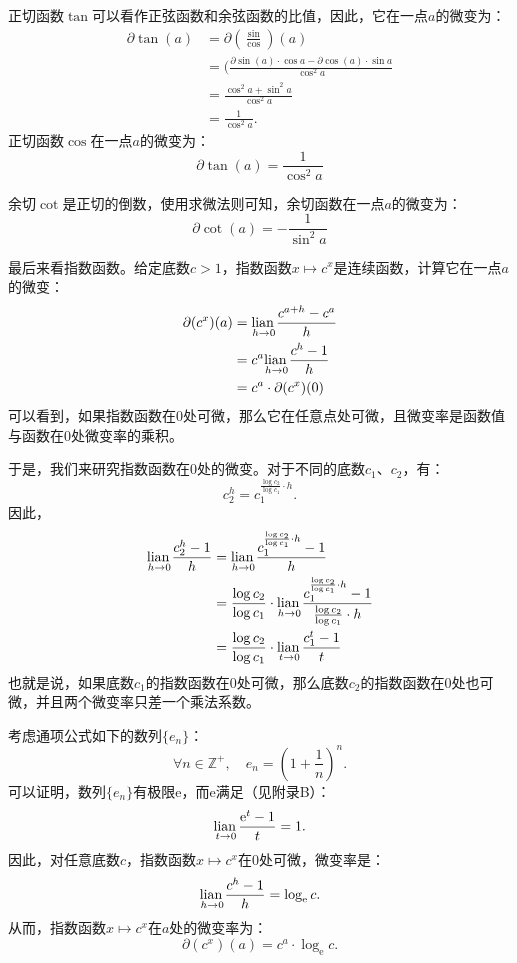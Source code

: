 \documentclass[12pt,UTF8]{ctexbook}
\begin{document}
正切函数$\tan$可以看作正弦函数和余弦函数的比值，因此，它在一点$a$的微变为：
\begin{align*}
    \partial \tan(a) &= \partial \left(\frac{\sin}{\cos}\right)(a)  \\
    &= (\frac{\partial \sin(a) \cdot \cos{a} - \partial \cos(a) \cdot \sin{a}}{\cos^2{a}}  \\
    &= \frac{\cos^2{a} + \sin^2{a}}{\cos^2{a}}  \\
    &= \frac{1}{\cos^2{a}}.  
\end{align*}
正切函数$\cos$在一点$a$的微变为：
$$ \partial \tan(a) = \frac{1}{\cos^2{a}} $$

余切$\cot$是正切的倒数，使用求微法则可知，余切函数在一点$a$的微变为：
$$ \partial \cot(a) = -\frac{1}{\sin^2{a}} $$

最后来看指数函数。给定底数$c > 1$，指数函数$x\mapsto c^x$是连续函数，计算它在一点$a$的微变：
\begin{align*}
    \partial (c^x) (a) &= \underset{h\to 0}{\operatorname{lian}\,} \frac{c^{a+h} - c^a}{h}  \\
    &= c^a \underset{h\to 0}{\operatorname{lian}\,} \frac{c^h - 1}{h}  \\
    &= c^a \cdot \partial (c^x) (0) 
\end{align*}
可以看到，如果指数函数在$0$处可微，那么它在任意点处可微，且微变率是函数值与函数在$0$处微变率的乘积。

于是，我们来研究指数函数在$0$处的微变。对于不同的底数$c_1$、$c_2$，有：
$$c_2^h = c_1^{\frac{\log{c_2}}{\log{c_1}}\cdot h}.$$
因此，
\begin{align*}
    \underset{h\to 0}{\operatorname{lian}\,} \frac{c_2^h - 1}{h} &= \underset{h\to 0}{\operatorname{lian}\,} \frac{c_1^{\frac{\log{c_2}}{\log{c_1}}\cdot h} - 1}{h}  \\
    &= \frac{\log{c_2}}{\log{c_1}} \cdot \underset{h\to 0}{\operatorname{lian}\,} \frac{c_1^{\frac{\log{c_2}}{\log{c_1}}\cdot h} - 1}{\frac{\log{c_2}}{\log{c_1}} \cdot h}  \\
    &= \frac{\log{c_2}}{\log{c_1}} \cdot \underset{t\to 0}{\operatorname{lian}\,} \frac{c_1^{t} - 1}{t}  
\end{align*}
也就是说，如果底数$c_1$的指数函数在$0$处可微，那么底数$c_2$的指数函数在$0$处也可微，并且两个微变率只差一个乘法系数。

考虑通项公式如下的数列$\{e_n\}$：
$$ \forall n\in\mathbb{Z}^+,\quad e_n = \left(1 + \frac{1}{n}\right)^n.$$
可以证明，数列$\{e_n\}$有极限$\mathrm{e}$，而$\mathrm{e}$满足（见附录B）：
$$ \underset{t\to 0}{\operatorname{lian}\,} \frac{\mathrm{e}^{t} - 1}{t} = 1.$$
因此，对任意底数$c$，指数函数$x\mapsto c^x$在$0$处可微，微变率是：
$$ \underset{h\to 0}{\operatorname{lian}\,} \frac{c^h - 1}{h} = \log_{\mathrm{e}}{c}.$$
从而，指数函数$x\mapsto c^x$在$a$处的微变率为：
$$ \partial (c^x) (a) = c^a \cdot \log_{\mathrm{e}}{c}. $$
\end{document}
